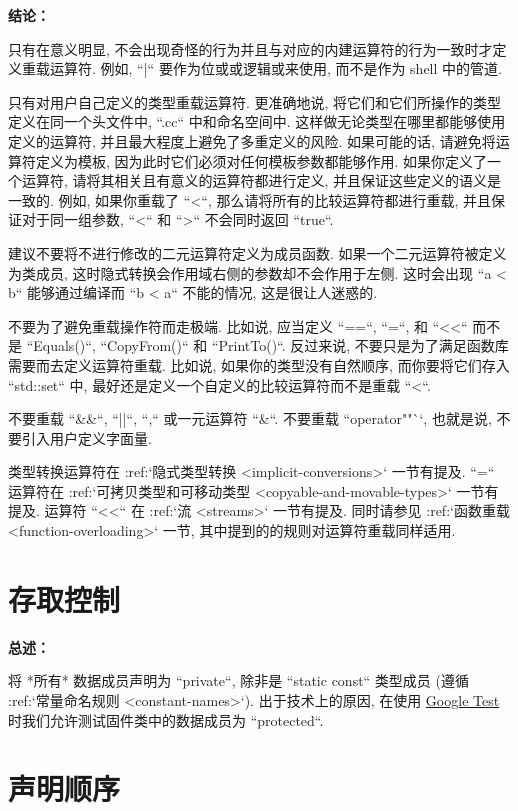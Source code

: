 \textbf{结论：}

只有在意义明显, 不会出现奇怪的行为并且与对应的内建运算符的行为一致时才定义重载运算符. 例如, ``|`` 要作为位或或逻辑或来使用, 而不是作为 shell 中的管道.

只有对用户自己定义的类型重载运算符. 更准确地说, 将它们和它们所操作的类型定义在同一个头文件中, ``.cc`` 中和命名空间中. 这样做无论类型在哪里都能够使用定义的运算符, 并且最大程度上避免了多重定义的风险. 如果可能的话, 请避免将运算符定义为模板, 因为此时它们必须对任何模板参数都能够作用. 如果你定义了一个运算符, 请将其相关且有意义的运算符都进行定义, 并且保证这些定义的语义是一致的. 例如, 如果你重载了 ``<``, 那么请将所有的比较运算符都进行重载, 并且保证对于同一组参数, ``<`` 和 ``>`` 不会同时返回 ``true``.

建议不要将不进行修改的二元运算符定义为成员函数. 如果一个二元运算符被定义为类成员, 这时隐式转换会作用域右侧的参数却不会作用于左侧. 这时会出现 ``a < b`` 能够通过编译而 ``b < a`` 不能的情况, 这是很让人迷惑的.

不要为了避免重载操作符而走极端. 比如说, 应当定义 ``==``, ``=``, 和 ``<<`` 而不是 ``Equals()``, ``CopyFrom()`` 和 ``PrintTo()``. 反过来说, 不要只是为了满足函数库需要而去定义运算符重载. 比如说, 如果你的类型没有自然顺序, 而你要将它们存入 ``std::set`` 中, 最好还是定义一个自定义的比较运算符而不是重载 ``<``.

不要重载 ``\&\&``, ``||``, ``,`` 或一元运算符 ``\&``. 不要重载 ``operator""``, 也就是说, 不要引入用户定义字面量.

类型转换运算符在 :ref:`隐式类型转换 <implicit-conversions>` 一节有提及. ``=`` 运算符在 :ref:`可拷贝类型和可移动类型 <copyable-and-movable-types>` 一节有提及. 运算符 ``<<`` 在 :ref:`流 <streams>` 一节有提及. 同时请参见 :ref:`函数重载 <function-overloading>` 一节, 其中提到的的规则对运算符重载同样适用.

\section{存取控制} \label{access-control}

\textbf{总述：}

将 *所有* 数据成员声明为 ``private``, 除非是 ``static const`` 类型成员 (遵循 :ref:`常量命名规则 <constant-names>`). 出于技术上的原因, 在使用 \href{https://github.com/google/googletest}{Google Test} 时我们允许测试固件类中的数据成员为 ``protected``.

\section{声明顺序} \label{declaration-order}

